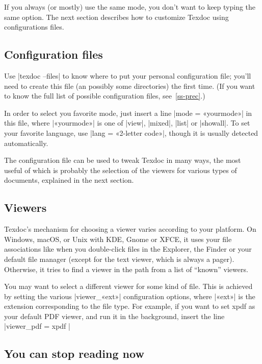 \documentclass[a4paper, oneside]{scrartcl}
\begin{document}
If you always (or mostly) use the same mode, you don't want to keep typing the
same option. The next section describes how to customize Texdoc using
configurations files.

\subsection{Configuration files}\label{ss-quick-file}

Use |texdoc --files| to know where to put your personal configuration file;
you'll need to create this file (an possibly some directories) the first time.
(If you want to know the full list of possible configuration files,
see~\ref{ss-prec}.)

In order to select you favorite mode, just insert a line |mode = «yourmode»|
in this file, where |«yourmode»| is one of |view|, |mixed|, |list| or
|showall|. To set your favorite language, use |lang = «2-letter code»|, though
it is usually detected automatically.

The configuration file can be used to tweak Texdoc in many ways, the most
useful of which is probably the selection of the viewers for various types of
documents, explained in the next section.

\subsection{Viewers}\label{ss-viewer}

Texdoc's mechanism for choosing a viewer varies according to your platform.
On Windows, macOS, or Unix with KDE, Gnome or XFCE, it uses your file
associations like when you double-click files in the Explorer, the Finder or
your default file manager (except for the text viewer, which is always a
pager). Otherwise, it tries to find a viewer in the path from a list of
``known'' viewers.

You may want to select a different viewer for some kind of file. This is
achieved by setting the various |viewer_«ext»| configuration options, where
|«ext»| is the extension corresponding to the file type. For example, if you
want to set xpdf as your default PDF viewer, and run it in the background,
insert the line |viewer_pdf = xpdf %
|%

\subsection{You can stop reading now}
\end{document}
